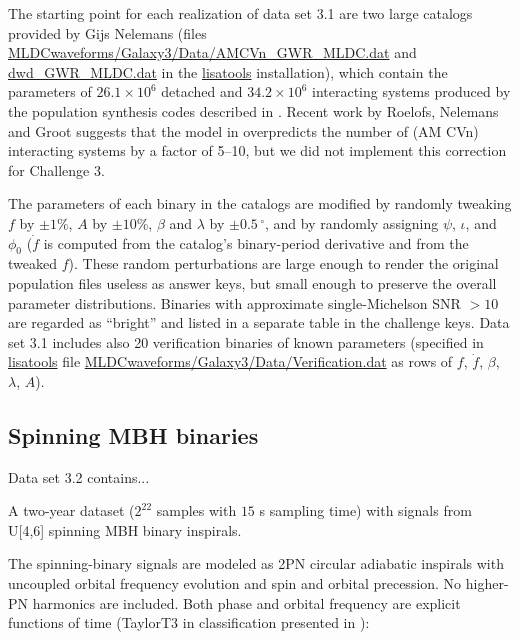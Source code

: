 \documentclass{iopart}
\begin{document}
The starting point for each realization of data set 3.1 are two large catalogs provided by Gijs Nelemans (files \url{MLDCwaveforms/Galaxy3/Data/AMCVn_GWR_MLDC.dat} and \url{dwd_GWR_MLDC.dat} in the \url{lisatools} installation), which contain the parameters of $26.1 \times 10^6$ detached and $34.2 \times 10^6$ interacting systems produced by the population synthesis codes described in \cite{Nelemans:2001hp, Nelemans:2003ha}. Recent work by Roelofs, Nelemans and Groot \cite{Roelofs:2007rn} suggests that the model in \cite{Nelemans:2003ha} overpredicts the number of (AM CVn) interacting systems by a factor of 5--10, but we did not implement this correction for Challenge 3.

The parameters of each binary in the catalogs are modified by randomly tweaking $f$ by $\pm 1\%$, $A$ by $\pm 10\%$, $\beta$ and $\lambda$ by $\pm 0.5\, {}^\circ$, and by randomly assigning $\psi$, $\iota$, and $\phi_0$ ($\dot{f}$ is computed from the catalog's binary-period derivative and from the tweaked $f$). These random perturbations are large enough to render the original population files useless as answer keys, but small enough to preserve the overall parameter distributions. Binaries with approximate single-Michelson SNR $> 10$ are regarded as ``bright'' and listed in a separate table in the challenge keys. Data set 3.1 includes also 20 verification binaries of known parameters (specified in \url{lisatools} file \url{MLDCwaveforms/Galaxy3/Data/Verification.dat} as rows of $f$, $\dot{f}$, $\beta$, $\lambda$, $A$).

\subsection{Spinning MBH binaries}
\label{sec:ch3mbh}

Data set 3.2 contains...

A two-year dataset ($2^{22}$ samples with $15$ s sampling time) with signals from U[4,6] spinning MBH binary inspirals.

The spinning-binary signals are modeled as 2PN circular adiabatic inspirals with uncoupled orbital frequency evolution
and spin and orbital precession. No higher-PN harmonics are included. Both phase and orbital
frequency are explicit functions of time (TaylorT3 in classification presented in \cite{DIS}):
\end{document}
